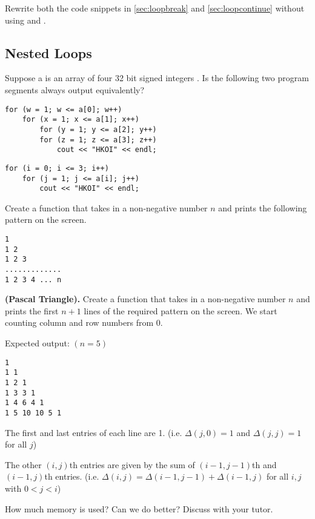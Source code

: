 \begin{questions}
\miquestion Rewrite both the code snippets in \cref{sec:loopbreak} and \cref{sec:loopcontinue} without using  and . 

\subsection*{Nested Loops}

 Suppose a is an array of four 32 bit signed integers . Is the following two program segments always output equivalently? 

\begin{lstlisting}
for (w = 1; w <= a[0]; w++)
    for (x = 1; x <= a[1]; x++)
        for (y = 1; y <= a[2]; y++)
        for (z = 1; z <= a[3]; z++)
            cout << "HKOI" << endl;
\end{lstlisting}

\begin{lstlisting}
for (i = 0; i <= 3; i++)
    for (j = 1; j <= a[i]; j++)
        cout << "HKOI" << endl;
\end{lstlisting}

\label{q:hkoi:2022hj:q2}
\miquestion Create a function that takes in a non-negative number $n$ and prints the following pattern on the screen.

\begin{lstlisting}
1
1 2
1 2 3
.............
1 2 3 4 ... n
\end{lstlisting}

 \textbf{(Pascal Triangle).} Create a function that takes in a non-negative number $n$ and prints the first $n+1$ lines of the required pattern on the screen. We start counting column and row numbers from 0.

Expected output: $(n = 5)$
\begin{lstlisting}
1
1 1
1 2 1
1 3 3 1
1 4 6 4 1
1 5 10 10 5 1
\end{lstlisting}

The first and last entries of each line are 1. (i.e. $\Delta(j,0) = 1$ and $\Delta(j,j) = 1$ for all $j$)

The other $(i,j)$th entries are given by the sum of $(i-1,j-1)$th and $(i-1,j)$th entries. (i.e. $\Delta(i,j) = \Delta(i-1,j-1) + \Delta(i-1,j)$ for all $i,j$ with $0 < j < i$)

How much memory is used? Can we do better? Discuss with your tutor.
\end{questions}